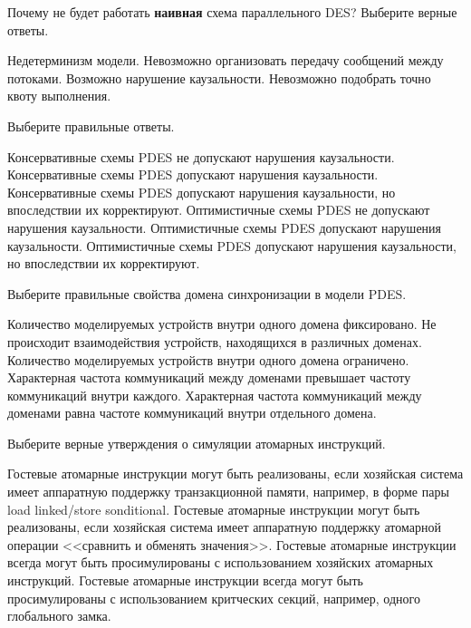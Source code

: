 \begin{questions}

\question[3] Почему не будет работать \textbf{наивная} схема параллельного DES? Выберите верные ответы.
\begin{choices}
    \correctchoice Недетерминизм модели.
    \choice Невозможно организовать передачу сообщений между потоками.
    \correctchoice Возможно нарушение каузальности.
    \choice Невозможно подобрать точно квоту выполнения.
\end{choices}


\question[3] Выберите правильные ответы.
\begin{choices}
    \correctchoice Консервативные схемы PDES не допускают нарушения каузальности.
    \choice Консервативные схемы PDES допускают нарушения каузальности.
    \choice Консервативные схемы PDES допускают нарушения каузальности, но впоследствии их корректируют.
    \choice Оптимистичные схемы PDES не допускают нарушения каузальности.
    \choice Оптимистичные схемы PDES допускают нарушения каузальности.
    \correctchoice Оптимистичные схемы PDES допускают нарушения каузальности, но впоследствии их корректируют.
\end{choices}

\question[3] Выберите правильные свойства домена синхронизации в модели PDES.
\begin{choices}
    \choice Количество моделируемых устройств внутри одного домена фиксировано.
    \choice Не происходит взаимодействия устройств, находящихся в различных доменах.
    \choice Количество моделируемых устройств внутри одного домена ограничено.
    \correctchoice Характерная частота коммуникаций  между доменами превышает частоту коммуникаций внутри каждого.
    \choice Характерная частота коммуникаций  между доменами равна частоте коммуникаций внутри отдельного домена.
\end{choices}

\question[3] Выберите верные утверждения о симуляции атомарных инструкций.
\begin{choices}
    \correctchoice Гостевые атомарные инструкции могут быть реализованы, если хозяйская система имеет аппаратную поддержку транзакционной памяти, например, в форме пары load linked/store sonditional.
    \correctchoice Гостевые атомарные инструкции могут быть реализованы, если хозяйская система имеет аппаратную поддержку  атомарной операции <<сравнить и обменять значения>>.
    \choice Гостевые атомарные инструкции всегда могут быть просимулированы с использованием хозяйских атомарных инструкций.
    \choice Гостевые атомарные инструкции всегда могут быть просимулированы с использованием критческих секций, например, одного глобального замка.
\end{choices}


\end{questions}
